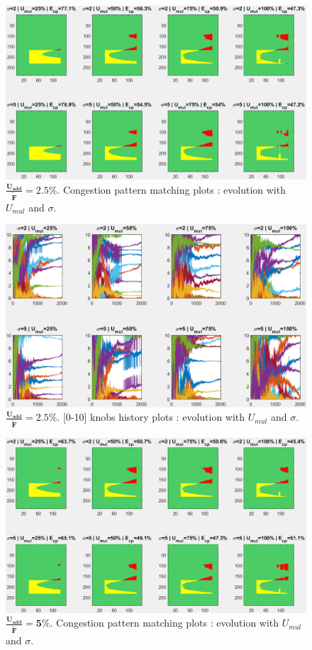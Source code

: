 \begin{figure}[!h]
	\centering
	\caption{$\mathbf{\frac{U_{add}}{\widetilde{F}}=2.5\%}$. Congestion pattern matching plots : evolution with $U_{mul}$ and $\sigma$.}
	\label{fig:uaddcp25}
	\includegraphics[width=7in]{figures/results_figures/Uadd/cp_Uadd_25_lambda_11.png}
\end{figure}	
\begin{figure}[!h]
\centering
	\caption{$\mathbf{\frac{U_{add}}{\widetilde{F}}=2.5\%}$. [0-10] knobs history plots : evolution with $U_{mul}$ and $\sigma$.}
	\label{fig:uaddknobs25}
	\includegraphics[width=7in]{figures/results_figures/Uadd/knobs_Uadd_25_lambda_11.png}
\end{figure}
\begin{figure}[!h]
	\centering
	\caption{$\mathbf{\frac{U_{add}}{\widetilde{F}}=5\%}$. Congestion pattern matching plots : evolution with $U_{mul}$ and $\sigma$.}
	\label{fig:uaddcp5}
	\includegraphics[width=7in]{figures/results_figures/Uadd/cp_Uadd_5_lambda_11.png}
\end{figure}	
